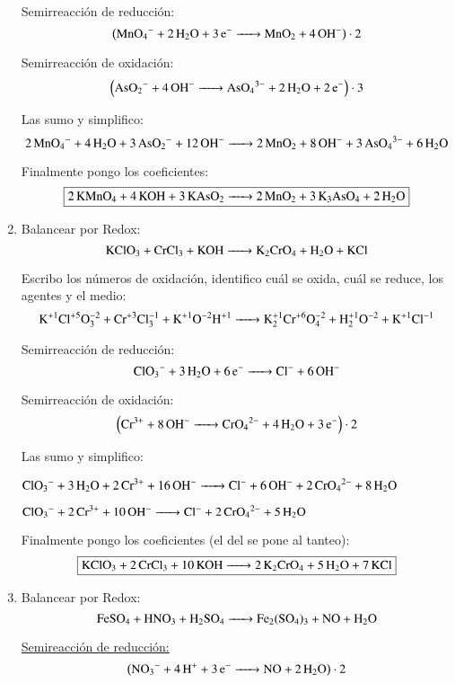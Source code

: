 \begin{enumerate}

\begin{multicols}{2}
Semirreacción de reducción:
$$\left(\ce{
MnO4^- + 2H2O + 3e^- ->
MnO2 + 4OH^-
}\right)\cdot 2$$

Semirreacción de oxidación:
$$\left(\ce{
AsO2^- + 4OH^- ->
AsO_4^{3-} + 2H2O + 2e^-
}\right)\cdot 3$$
\end{multicols}

Las sumo y simplifico:
$$\ce{
2MnO4^- + 4 H2O + 3AsO2^- + 12 OH^- ->
2MnO2 + 8OH^- + 3 AsO4^{3-} + 6H2O
}$$

Finalmente pongo los coeficientes:
$$\fbox{\ce{
2KMnO4 + 4KOH + 3KAsO2 ->
2MnO2 + 3K3AsO4 + 2H2O
}}$$


\item
Balancear por Redox:
$$\ce{
KClO3 + CrCl3 + KOH ->
K2CrO4 + H2O + KCl
}$$

Escribo los números de oxidación, identifico cuál se oxida, cuál se reduce, los agentes y el medio:
$$\ce{
K^{+1}Cl^{+5}O^{-2}3 + Cr^{+3}Cl^{-1}3 + K^{+1}O^{-2}H^{+1} ->
K^{+1}2Cr^{+6}O^{-2}4 + H^{+1}2O^{-2} + K^{+1}Cl^{-1}
}$$


\begin{multicols}{2}
Semirreacción de reducción:
$$\ce{
ClO3^- + 3H2O + 6e^- ->
Cl^- + 6OH^-
}$$

Semirreacción de oxidación:
$$\left( \ce{
Cr^{3+} +8OH^- ->
CrO_4^{2-} + 4H2O + 3e^-
}\right) \cdot 2$$
\end{multicols}

Las sumo y simplifico:

\hfil$\ce{
ClO3^- + 3H2O + 2Cr^{3+} + 16OH^- ->
Cl^- + 6OH^- + 2CrO_4^{2-} + 8H2O
}$\hfil

\hfil$\ce{
ClO3^- + 2Cr^{3+} + 10OH^- ->
Cl^- + 2CrO_4^{2-} + 5H2O
}$\hfil

Finalmente pongo los coeficientes (el del  se pone al tanteo):
$$\fbox{\ce{
KClO3 + 2CrCl3 + 10KOH ->
2K2CrO4 + 5H2O + 7KCl
}}$$


\newpage
\item Balancear por Redox:
$$\ce{FeSO4 + HNO3 + H2SO4 -> Fe2(SO4)3 + NO + H2O}$$


\begin{multicols}{2}
\underline{Semireacción de reducción:}
 $$\left(\ce{NO_3^- + 4H^+ + 3e^- -> NO + 2H_2O}\right)\cdot 2$$


\end{multicols}
\end{enumerate}
